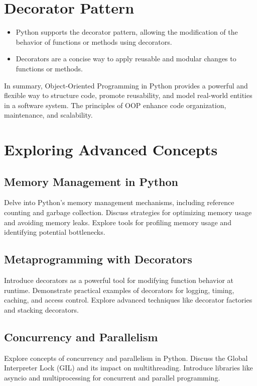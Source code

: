 \documentclass{article}
\begin{document}
\section{Decorator Pattern}
\begin{itemize}
    \item Python supports the decorator pattern, allowing the modification of the behavior of functions or methods using decorators.
    \item Decorators are a concise way to apply reusable and modular changes to functions or methods.
\end{itemize}In summary, Object-Oriented Programming in Python provides a powerful and flexible way to structure code, promote reusability, and model real-world entities in a software system. The principles of OOP enhance code organization, maintenance, and scalability.


\newpage
\thispagestyle{empty}
\section{Exploring Advanced Concepts}

\subsection{Memory Management in Python}

Delve into Python's memory management mechanisms, including reference counting and garbage collection.
Discuss strategies for optimizing memory usage and avoiding memory leaks.
Explore tools for profiling memory usage and identifying potential bottlenecks.

\subsection{Metaprogramming with Decorators}

Introduce decorators as a powerful tool for modifying function behavior at runtime.
Demonstrate practical examples of decorators for logging, timing, caching, and access control.
Explore advanced techniques like decorator factories and stacking decorators.

\subsection{Concurrency and Parallelism}

Explore concepts of concurrency and parallelism in Python.
Discuss the Global Interpreter Lock (GIL) and its impact on multithreading.
Introduce libraries like asyncio and multiprocessing for concurrent and parallel programming.
\end{document}
